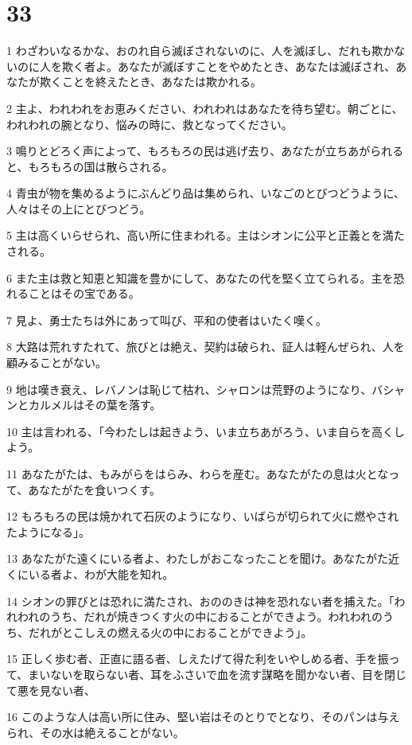 \chapter{33}

\par 1 わざわいなるかな、おのれ自ら滅ぼされないのに、人を滅ぼし、だれも欺かないのに人を欺く者よ。あなたが滅ぼすことをやめたとき、あなたは滅ぼされ、あなたが欺くことを終えたとき、あなたは欺かれる。
\par 2 主よ、われわれをお恵みください、われわれはあなたを待ち望む。朝ごとに、われわれの腕となり、悩みの時に、救となってください。
\par 3 鳴りとどろく声によって、もろもろの民は逃げ去り、あなたが立ちあがられると、もろもろの国は散らされる。
\par 4 青虫が物を集めるようにぶんどり品は集められ、いなごのとびつどうように、人々はその上にとびつどう。
\par 5 主は高くいらせられ、高い所に住まわれる。主はシオンに公平と正義とを満たされる。
\par 6 また主は救と知恵と知識を豊かにして、あなたの代を堅く立てられる。主を恐れることはその宝である。
\par 7 見よ、勇士たちは外にあって叫び、平和の使者はいたく嘆く。
\par 8 大路は荒れすたれて、旅びとは絶え、契約は破られ、証人は軽んぜられ、人を顧みることがない。
\par 9 地は嘆き衰え、レバノンは恥じて枯れ、シャロンは荒野のようになり、バシャンとカルメルはその葉を落す。
\par 10 主は言われる、「今わたしは起きよう、いま立ちあがろう、いま自らを高くしよう。
\par 11 あなたがたは、もみがらをはらみ、わらを産む。あなたがたの息は火となって、あなたがたを食いつくす。
\par 12 もろもろの民は焼かれて石灰のようになり、いばらが切られて火に燃やされたようになる」。
\par 13 あなたがた遠くにいる者よ、わたしがおこなったことを聞け。あなたがた近くにいる者よ、わが大能を知れ。
\par 14 シオンの罪びとは恐れに満たされ、おののきは神を恐れない者を捕えた。「われわれのうち、だれが焼きつくす火の中におることができよう。われわれのうち、だれがとこしえの燃える火の中におることができよう」。
\par 15 正しく歩む者、正直に語る者、しえたげて得た利をいやしめる者、手を振って、まいないを取らない者、耳をふさいで血を流す謀略を聞かない者、目を閉じて悪を見ない者、
\par 16 このような人は高い所に住み、堅い岩はそのとりでとなり、そのパンは与えられ、その水は絶えることがない。
